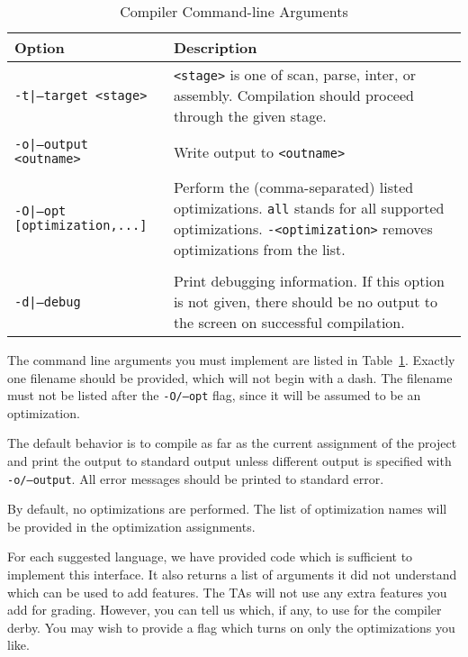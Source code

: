 \documentclass[11pt]{article}
\begin{document}
\begin{table}
\begin{center}
  \begin{tabular}{lp{3in}} \toprule
    \textbf{Option} & \textbf{Description} \\
    \midrule

    {\tt -t|--target <stage>} & {\tt <stage>} is one of scan, parse, inter, or assembly.
                                 Compilation should proceed through the given stage. \\
    \\ {\tt -o|--output <outname>} & Write output to {\tt <outname>} \\
    \\ {\tt -O|--opt [optimization,...]} & Perform the (comma-separated) listed optimizations.
                                           {\tt all} stands for all supported optimizations.
                                           {\tt -<optimization>} removes optimizations from the list.\\
    \\ {\tt -d|--debug} & Print debugging information.
                          If this option is not given, there should be no output to the screen on successful compilation.\\
\bottomrule
\end{tabular}
\caption{Compiler Command-line Arguments}
\label{tab:commandline}
\end{center}
\end{table}

The command line arguments you must implement are listed in Table~\ref{tab:commandline}.
Exactly one filename should be provided, which will not begin with a dash.
The filename must not be listed after the {\tt -O/--opt} flag, since it will be assumed to be an optimization.

The default behavior is to compile as far as the current assignment of the project and print the output to standard output unless different output is specified with {\tt -o/--output}.
All error messages should be printed to standard error.

By default, no optimizations are performed.
The list of optimization names will be provided in the optimization assignments.

For each suggested language, we have provided code which is sufficient to implement this interface.
It also returns a list of arguments it did not understand which can be used to add features.
The TAs will not use any extra features you add for grading.
However, you can tell us which, if any, to use for the compiler derby.
You may wish to provide a flag which turns on only the optimizations you like.
\end{document}
